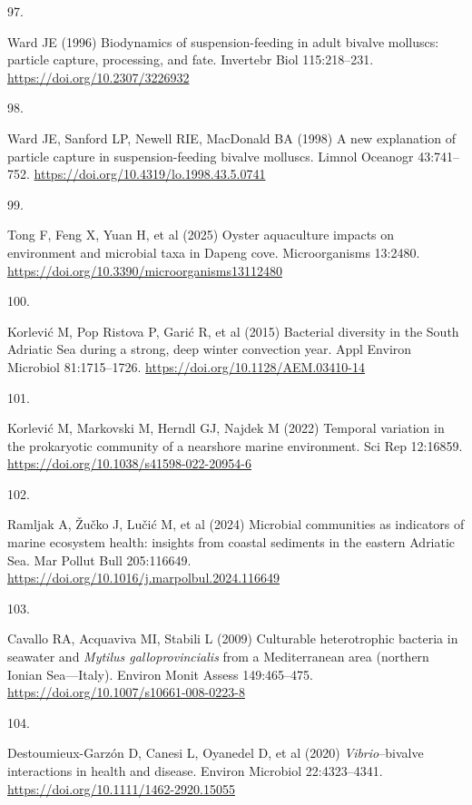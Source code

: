 \documentclass[
  12 pt,
]{article}
\newlength{\cslhangindent}
\newlength{\csllabelwidth}
\newenvironment{CSLReferences}[2] %
 {\begin{list}{}{%
  \setlength{\itemindent}{0pt}
  \setlength{\leftmargin}{0pt}
  \setlength{\parsep}{0pt}
  \ifodd #1
   \setlength{\leftmargin}{\cslhangindent}
   \setlength{\itemindent}{-1\cslhangindent}
  \fi
  \setlength{\itemsep}{#2\baselineskip}}}
 {\end{list}}
\newcommand{\CSLLeftMargin}[1]{\parbox[t]{\csllabelwidth}{\strut#1\strut}}
\newcommand{\CSLRightInline}[1]{\parbox[t]{\linewidth - \csllabelwidth}{\strut#1\strut}}
\begin{document}
\begin{CSLReferences}{0}{0}
\CSLLeftMargin{97. }%
\CSLRightInline{Ward JE (1996) Biodynamics of suspension-feeding in adult bivalve molluscs: particle capture, processing, and fate. Invertebr Biol 115:218--231. \url{https://doi.org/10.2307/3226932}}

\CSLLeftMargin{98. }%
\CSLRightInline{Ward JE, Sanford LP, Newell RIE, MacDonald BA (1998) A new explanation of particle capture in suspension-feeding bivalve molluscs. Limnol Oceanogr 43:741--752. \url{https://doi.org/10.4319/lo.1998.43.5.0741}}

\CSLLeftMargin{99. }%
\CSLRightInline{Tong F, Feng X, Yuan H, et al (2025) Oyster aquaculture impacts on environment and microbial taxa in Dapeng cove. Microorganisms 13:2480. \url{https://doi.org/10.3390/microorganisms13112480}}

\CSLLeftMargin{100. }%
\CSLRightInline{Korlević M, Pop Ristova P, Garić R, et al (2015) Bacterial diversity in the {South Adriatic Sea} during a strong, deep winter convection year. Appl Environ Microbiol 81:1715--1726. \url{https://doi.org/10.1128/AEM.03410-14}}

\CSLLeftMargin{101. }%
\CSLRightInline{Korlević M, Markovski M, Herndl GJ, Najdek M (2022) Temporal variation in the prokaryotic community of a nearshore marine environment. Sci Rep 12:16859. \url{https://doi.org/10.1038/s41598-022-20954-6}}

\CSLLeftMargin{102. }%
\CSLRightInline{Ramljak A, Žučko J, Lučić M, et al (2024) Microbial communities as indicators of marine ecosystem health: insights from coastal sediments in the eastern {Adriatic Sea}. Mar Pollut Bull 205:116649. \url{https://doi.org/10.1016/j.marpolbul.2024.116649}}

\CSLLeftMargin{103. }%
\CSLRightInline{Cavallo RA, Acquaviva MI, Stabili L (2009) Culturable heterotrophic bacteria in seawater and {\emph{Mytilus galloprovincialis}} from a Mediterranean area (northern Ionian Sea---Italy). Environ Monit Assess 149:465--475. \url{https://doi.org/10.1007/s10661-008-0223-8}}

\CSLLeftMargin{104. }%
\CSLRightInline{Destoumieux-Garzón D, Canesi L, Oyanedel D, et al (2020) {\emph{Vibrio}}--bivalve interactions in health and disease. Environ Microbiol 22:4323--4341. \url{https://doi.org/10.1111/1462-2920.15055}}


\end{CSLReferences}
\end{document}
